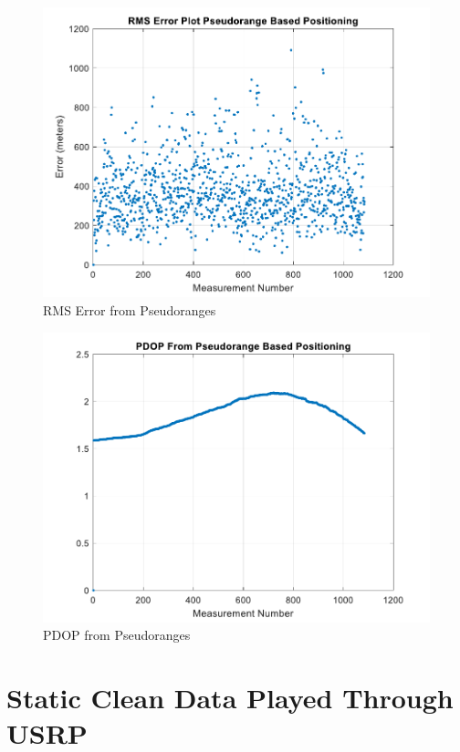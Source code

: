 \documentclass[12pt]{report}
\begin{document}
\begin{figure}[h!]
    \centering
    \includegraphics[width=5in]
    {15min_irid_clean_pseudo_rmse.pdf}
    \caption{RMS Error from Pseudoranges}
    \label{fig:CleanPseudo15minIridRSME}
\end{figure}

\begin{figure}[h!]
    \centering
    \includegraphics[width=5in]
    {15min_irid_clean_pseudorange_pdop.pdf}
    \caption{PDOP from Pseudoranges}
    \label{fig:CleanPseudo15minIridPositPDOP}
\end{figure}

\section{Static Clean Data Played Through USRP}
\end{document}
